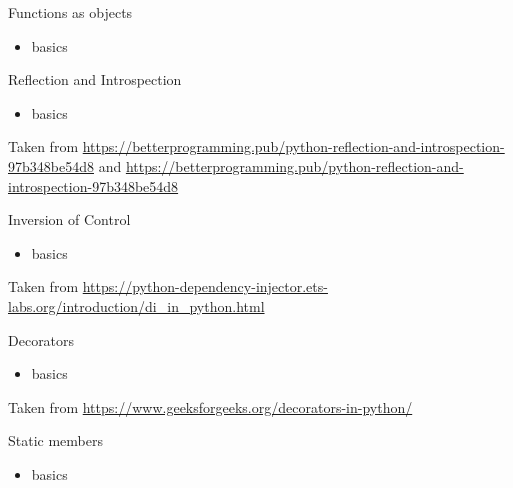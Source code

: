 \documentclass{beamer}
\begin{document}
\begin{frame}
{\centerline{Functions as objects}}
\begin{itemize}
    \item basics
\end{itemize} 
\end{frame}

\begin{frame}
{\centerline{Reflection and Introspection}}
\begin{itemize}
    \item basics
\end{itemize} 
\begin{center}
    \tiny{Taken from \url{https://betterprogramming.pub/python-reflection-and-introspection-97b348be54d8} and \url{https://betterprogramming.pub/python-reflection-and-introspection-97b348be54d8}}
\end{center}

\end{frame}

\begin{frame}
{\centerline{Inversion of Control}}
\begin{itemize}
    \item basics
\end{itemize} 
\begin{center}
    \tiny{Taken from \url{https://python-dependency-injector.ets-labs.org/introduction/di_in_python.html}}
\end{center}

\end{frame}


\begin{frame}
{\centerline{Decorators}}
\begin{itemize}
    \item basics
\end{itemize} 
\begin{center}
    \tiny{Taken from \url{https://www.geeksforgeeks.org/decorators-in-python/}}
\end{center}

\end{frame}


\begin{frame}
{\centerline{Static members}}
\begin{itemize}
    \item basics
\end{itemize} 
\end{frame}
\end{document}
